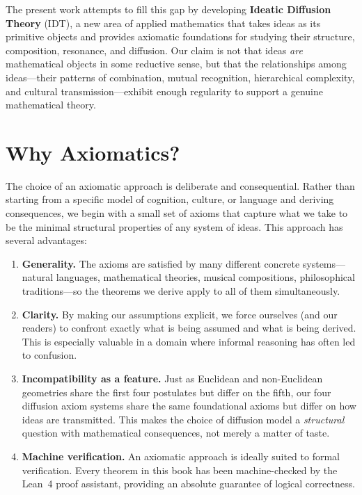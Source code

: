 \documentclass[11pt,openany]{book}
\theoremstyle{definition}
\theoremstyle{plain}
\theoremstyle{remark}
\begin{document}
The present work attempts to fill this gap by developing \textbf{Ideatic Diffusion Theory} (IDT), a new area of applied mathematics that takes ideas as its primitive objects and provides axiomatic foundations for studying their structure, composition, resonance, and diffusion. Our claim is not that ideas \emph{are} mathematical objects in some reductive sense, but that the relationships among ideas---their patterns of combination, mutual recognition, hierarchical complexity, and cultural transmission---exhibit enough regularity to support a genuine mathematical theory.

\section{Why Axiomatics?}

The choice of an axiomatic approach is deliberate and consequential. Rather than starting from a specific model of cognition, culture, or language and deriving consequences, we begin with a small set of axioms that capture what we take to be the minimal structural properties of any system of ideas. This approach has several advantages:

\begin{enumerate}
\item \textbf{Generality.} The axioms are satisfied by many different concrete systems---natural languages, mathematical theories, musical compositions, philosophical traditions---so the theorems we derive apply to all of them simultaneously.

\item \textbf{Clarity.} By making our assumptions explicit, we force ourselves (and our readers) to confront exactly what is being assumed and what is being derived. This is especially valuable in a domain where informal reasoning has often led to confusion.

\item \textbf{Incompatibility as a feature.} Just as Euclidean and non-Euclidean geometries share the first four postulates but differ on the fifth, our four diffusion axiom systems share the same foundational axioms but differ on how ideas are transmitted. This makes the choice of diffusion model a \emph{structural} question with mathematical consequences, not merely a matter of taste.

\item \textbf{Machine verification.} An axiomatic approach is ideally suited to formal verification. Every theorem in this book has been machine-checked by the Lean~4 proof assistant, providing an absolute guarantee of logical correctness.
\end{enumerate}
\end{document}
